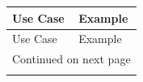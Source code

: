 \documentclass{article}
\begin{document}
\begin{longtable}{p{} p{}}
\toprule
      Use Case &                                                                                                                                                                                                                                                                                                                                                                                                                      Example \\ \midrule
\midrule
\endfirsthead

\toprule
      Use Case &                                                                                                                                                                                                                                                                                                                                                                                                                      Example \\ \midrule
\midrule
\endhead
\midrule
\multicolumn{2}{r}{{Continued on next page}} \\ \midrule
\midrule
\endfoot


\end{longtable}
\end{document}
